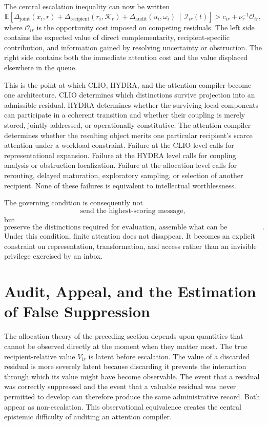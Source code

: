 \documentclass[11pt]{article}
\theoremstyle{definition}
\newcommand{\E}{\mathbb{E}}
\newcommand{\K}{\mathcal{K}}
\newcommand{\given}{\,\middle|\,}
\begin{document}
The central escalation inequality can now be written
\[
\E\!\left[
\Delta_{\mathrm{joint}}(x_i,r)
+
\Delta_{\mathrm{recipient}}(r_i,\K_r)
+
\Delta_{\mathrm{audit}}(u_i,\omega_i)
\given
\mathscr{I}_{ir}(t)
\right]
>
c_{ir}
+
\nu_r^{-1}\mathcal{O}_{ir},
\]
where \(\mathcal{O}_{ir}\) is the opportunity cost imposed on competing residuals. The left side contains the expected value of direct complementarity, recipient-specific contribution, and information gained by resolving uncertainty or obstruction. The right side contains both the immediate attention cost and the value displaced elsewhere in the queue.

This is the point at which CLIO, HYDRA, and the attention compiler become one architecture. CLIO determines which distinctions survive projection into an admissible residual. HYDRA determines whether the surviving local components can participate in a coherent transition and whether their coupling is merely stored, jointly addressed, or operationally constitutive. The attention compiler determines whether the resulting object merits one particular recipient's scarce attention under a workload constraint. Failure at the CLIO level calls for representational expansion. Failure at the HYDRA level calls for coupling analysis or obstruction localization. Failure at the allocation level calls for rerouting, delayed maturation, exploratory sampling, or selection of another recipient. None of these failures is equivalent to intellectual worthlessness.

The governing condition is consequently not
\[
\text{send the highest-scoring message},
\]
but
\[
\text{preserve the distinctions required for evaluation, assemble what can be assembled, expose what cannot be glued, and spend recipient attention only where its marginal joint value exceeds its full opportunity cost}.
\]
Under this condition, finite attention does not disappear. It becomes an explicit constraint on representation, transformation, and access rather than an invisible privilege exercised by an inbox.

\section{Audit, Appeal, and the Estimation of False Suppression}

The allocation theory of the preceding section depends upon quantities that cannot be observed directly at the moment when they matter most. The true recipient-relative value \(V_{ir}\) is latent before escalation. The value of a discarded residual is more severely latent because discarding it prevents the interaction through which its value might have become observable. The event that a residual was correctly suppressed and the event that a valuable residual was never permitted to develop can therefore produce the same administrative record. Both appear as non-escalation. This observational equivalence creates the central epistemic difficulty of auditing an attention compiler.
\end{document}
